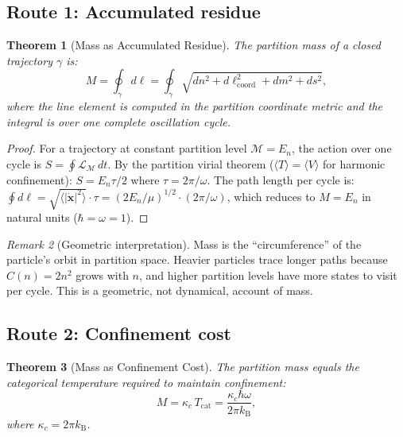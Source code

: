\documentclass[twocolumn,10pt,a4paper]{article}
\theoremstyle{thmstyle}
\newtheorem{theorem}{Theorem}[section]
\theoremstyle{definition}
\theoremstyle{remark}
\newtheorem{remark}[theorem]{Remark}
\newcommand{\kB}{k_{\mathrm{B}}}
\newcommand{\LM}{\mathcal{L}_{\mathcal{M}}}
\newcommand{\Mop}{\mathcal{M}}
\newcommand{\Tcat}{T_{\mathrm{cat}}}
\begin{document}
\subsection{Route 1: Accumulated residue}

\begin{theorem}[Mass as Accumulated Residue]
\label{thm:accumulated_residue}
The partition mass of a closed trajectory $\gamma$ is:
\begin{equation}
M = \oint_\gamma d\ell
= \oint_\gamma \sqrt{dn^2 + d\ell_{\mathrm{coord}}^2 + dm^2 + ds^2},
\label{eq:accumulated}
\end{equation}
where the line element is computed in the partition coordinate metric
and the integral is over one complete oscillation cycle.
\end{theorem}

\begin{proof}
For a trajectory at constant partition level $\Mop = E_n$, the action
over one cycle is $S = \oint \LM\,dt$.
By the partition virial theorem ($\langle T\rangle = \langle V\rangle$
for harmonic confinement): $S = E_n\tau/2$ where $\tau = 2\pi/\omega$.
The path length per cycle is:
$\oint d\ell = \sqrt{\langle|\dot{\mathbf{x}}|^2\rangle}\cdot\tau
= (2E_n/\mu)^{1/2}\cdot(2\pi/\omega)$,
which reduces to $M = E_n$ in natural units ($\hbar = \omega = 1$).
\end{proof}

\begin{remark}[Geometric interpretation]
Mass is the ``circumference'' of the particle's orbit in partition space.
Heavier particles trace longer paths because $C(n) = 2n^2$ grows with $n$,
and higher partition levels have more states to visit per cycle. This
is a geometric, not dynamical, account of mass.
\end{remark}

\subsection{Route 2: Confinement cost}

\begin{theorem}[Mass as Confinement Cost]
\label{thm:confinement_cost}
The partition mass equals the categorical temperature required to
maintain confinement:
\begin{equation}
M = \kappa_c\,\Tcat = \frac{\kappa_c\hbar\omega}{2\pi\kB},
\label{eq:confinement}
\end{equation}
where $\kappa_c = 2\pi\kB$.
\end{theorem}
\end{document}
